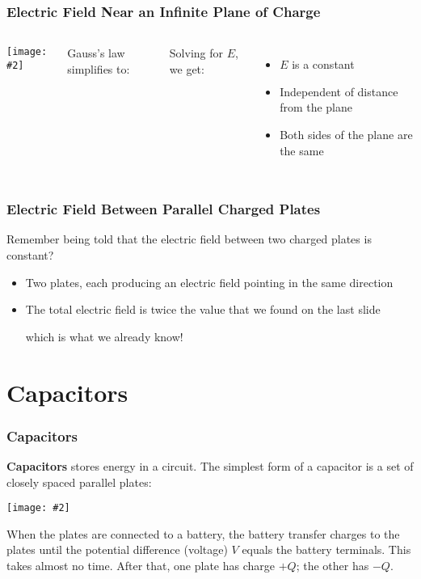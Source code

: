 \documentclass[12pt,aspectratio=169]{beamer}
\newcommand{\pic}[2]{\texttt{[image: \#2]}}
\newcommand{\mb}[1]{\mathbf{#1}}
\newcommand{\eq}[2]{\vspace{#1}{\Large\begin{displaymath}#2\end{displaymath}}}
\begin{document}
\begin{frame}
  \frametitle{Electric Field Near an Infinite Plane of Charge}
  \begin{columns}
    \pic{1.25}{elec_gauss_figure9.jpg}

    Gauss's law simplifies to:
    
    \eq{-.35in}{
      \oint\mb{E}\cdot d\mb{A}=\frac{Q_\mathrm{encl}}{\epsilon_0}
      \;\;\rightarrow\;\;
      E(2A)=\frac{\sigma A}{\epsilon_0}
    }

    Solving for $E$, we get:

    \eq{-.3in}{\boxed{E=\frac{\sigma}{2\epsilon_0}}}
    \begin{itemize}
    \item $E$ is a constant
    \item Independent of distance from the plane
    \item Both sides of the plane are the same
    \end{itemize}
  \end{columns}
\end{frame}



\begin{frame}
  \frametitle{Electric Field Between Parallel Charged Plates}
  Remember being told that the electric field between two charged plates
  is constant?

  \begin{itemize}
  \item Two plates, each producing an electric field pointing in the same
    direction
  \item The total electric field is twice the value that we found on the last
    slide

    \eq{-.1in}{\boxed{E=\frac{\sigma}{\epsilon_0}}}

    which is what we already know!
  \end{itemize}
\end{frame}




\section{Capacitors}


\begin{frame}
  \frametitle{Capacitors}
  \textbf{Capacitors} stores energy in a circuit. The
  simplest form of a capacitor is a set of closely spaced parallel plates:

  \vspace{-.3in}
  \begin{center}
    \pic{.5}{cap19.png}
  \end{center}
  
  \vspace{-.15in}When the plates are connected to a battery, the battery
  transfer charges to the plates until the potential difference (voltage) $V$
  equals the battery terminals. This takes almost no time. After that, one
  plate has charge $+Q$; the other has $-Q$.
\end{frame}
\end{document}
